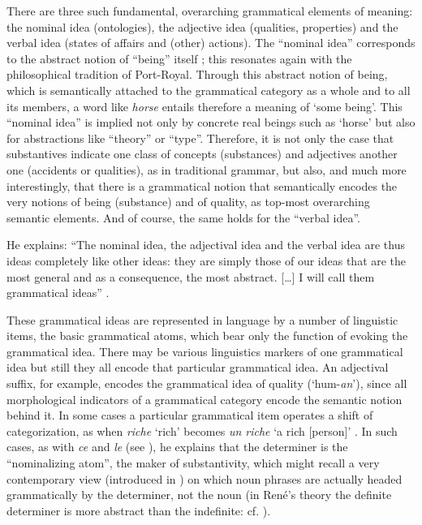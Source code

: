 \documentclass[output=paper]{langsci/langscibook}
\begin{document}
There are three such fundamental, overarching grammatical elements of
meaning: the nominal idea (ontologies), the adjective idea (qualities,
properties) and the verbal idea (states of affairs and (other)
actions). The ``nominal idea'' corresponds to the abstract notion of
``being'' itself \citep[10]{r.desaussure11:formation}; this resonates
again with the philosophical tradition of Port-Royal. Through this
abstract notion of being, which is semantically attached to the
grammatical category as a whole and to all its members, a word like
\emph{horse} entails therefore a meaning of ‘some being’. This
``nominal idea'' is implied not only by concrete real beings such as
‘horse’ but also for abstractions like ``theory'' or ``type''. Therefore,
it is not only the case that substantives indicate one class of
concepts (substances) and adjectives another one (accidents or
qualities), as in traditional grammar, but also, and much more
interestingly, that there is a grammatical notion that semantically
encodes the very notions of being (substance) and of quality, as
top-most overarching semantic elements. And of course, the same holds
for the ``verbal idea''.

He explains: “The nominal idea, the adjectival idea and the verbal
idea are thus ideas completely like other ideas: they are simply those
of our ideas that are the most general and as a consequence, the most
abstract. […] I will call them grammatical ideas”
\citep[12]{r.desaussure11:formation}.

These grammatical ideas are represented in language by a number of
linguistic items, the basic grammatical atoms, which bear only the
function of evoking the grammatical idea. There may be various
linguistics markers of one grammatical idea but still they all encode
that particular grammatical idea. An adjectival suffix, for example,
encodes the grammatical idea of quality (‘hum-\emph{an}’), since all
morphological indicators of a grammatical category encode the semantic
notion behind it. In some cases a particular grammatical item operates
a shift of categorization, as when \emph{riche} ‘rich’ becomes
\emph{un riche} ‘a rich [person]'
\citep[19]{r.desaussure11:formation}. In such cases, as with
\emph{ce} and \emph{le} (see \citealt[28]{r.desaussure11:formation}),
he explains that the determiner is the ``nominalizing atom'', the maker
of substantivity, which might recall a very contemporary view
(introduced in \citealt{abney:thesis}) on which noun phrases are
actually headed grammatically by the determiner, not the noun (in
René's theory the definite determiner is more abstract than the
indefinite: cf. \citealt[27--28]{r.desaussure11:formation}).
\end{document}
